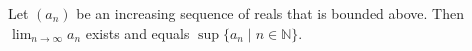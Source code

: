 Let $(a_{n})$ be an increasing sequence of reals that is bounded above.
Then $\lim_{n \to \infty} a_{n}$ exists and equals $\sup \{a_{n} \mid n \in \mathbb{N}\}$.
